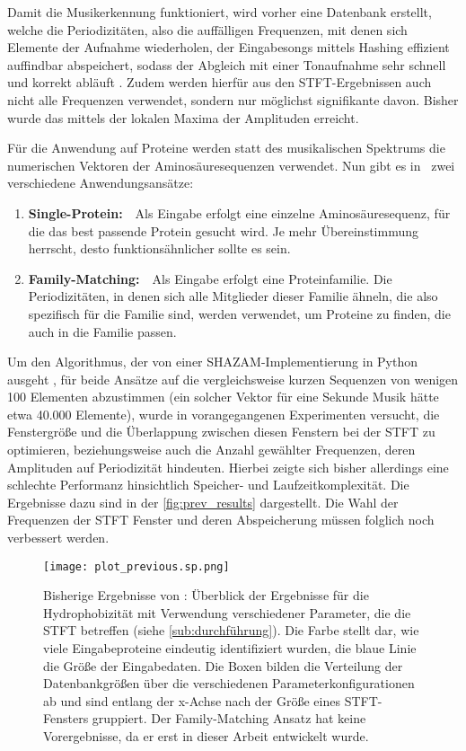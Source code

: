     Damit die Musikerkennung funktioniert, wird vorher eine Datenbank erstellt, welche die Periodizitäten, also die auffälligen Frequenzen, mit denen sich Elemente der Aufnahme wiederholen, der Eingabesongs mittels Hashing effizient auffindbar abspeichert, sodass der Abgleich mit einer Tonaufnahme sehr schnell und korrekt abläuft . Zudem werden hierfür aus den \ac{STFT}-Ergebnissen auch nicht alle Frequenzen verwendet, sondern nur möglichst signifikante davon. Bisher wurde das mittels der lokalen Maxima der Amplituden erreicht.

    Für die Anwendung auf Proteine werden statt des musikalischen Spektrums die numerischen Vektoren der Aminosäuresequenzen verwendet. Nun gibt es in \protfin\ zwei verschiedene Anwendungsansätze:
    \begin{enumerate}
        \item \textbf{Single-Protein:}\ \ Als Eingabe erfolgt eine einzelne Aminosäuresequenz, für die das best passende Protein gesucht wird. Je mehr Übereinstimmung herrscht, desto funktionsähnlicher sollte es sein.
        \item \textbf{Family-Matching:}\ \ Als Eingabe erfolgt eine Proteinfamilie. Die Periodizitäten, in denen sich alle Mitglieder dieser Familie ähneln, die also spezifisch für die Familie sind, werden verwendet, um Proteine zu finden, die auch in die Familie passen.
    \end{enumerate}
    \label{kurze_sequenzen}

    Um den Algorithmus, der von einer SHAZAM-Implementierung in Python ausgeht \autocite{blog}, für beide Ansätze auf die vergleichsweise kurzen Sequenzen von wenigen 100 Elementen abzustimmen (ein solcher Vektor für eine Sekunde Musik hätte etwa 40.000 Elemente), wurde in vorangegangenen Experimenten versucht, die Fenstergröße und die Überlappung zwischen diesen Fenstern bei der \ac{STFT} zu optimieren, beziehungsweise auch die Anzahl gewählter Frequenzen, deren Amplituden auf Periodizität hindeuten. Hierbei zeigte sich bisher allerdings eine schlechte Performanz hinsichtlich Speicher- und Laufzeitkomplexität. Die Ergebnisse dazu sind in der \autoref{fig:prev_results} dargestellt. Die Wahl der Frequenzen der \ac{STFT} Fenster und deren Abspeicherung müssen folglich noch verbessert werden.

    \begin{figure}[H]
        \texttt{[image: plot\_previous.sp.png]}
        \caption[Bisherige Ergebnisse von \protfin]{Bisherige Ergebnisse von \protfin: Überblick der Ergebnisse für die Hydrophobizität mit Verwendung verschiedener Parameter, die die \acs{STFT} betreffen (siehe \autoref{sub:durchführung}). Die Farbe stellt dar, wie viele Eingabeproteine eindeutig identifiziert wurden, die blaue Linie die Größe der Eingabedaten. Die Boxen bilden die Verteilung der Datenbankgrößen über die verschiedenen Parameterkonfigurationen ab und sind entlang der x-Achse nach der Größe eines STFT-Fensters gruppiert. Der Family-Matching Ansatz hat keine Vorergebnisse, da er erst in dieser Arbeit entwickelt wurde.}
        \label{fig:prev_results}
    \end{figure}

